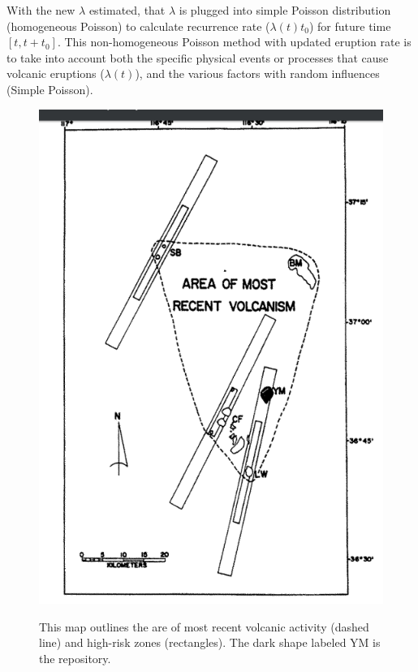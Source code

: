 \documentclass[12pt]{article}
\begin{document}
With the new $\lambda$ estimated, that $\lambda$ is plugged into simple Poisson distribution
(homogeneous Poisson) to calculate recurrence rate ($\lambda(t) t_0 $) for future time $[t, t+t_0]$.
This non-homogeneous Poisson method with updated eruption rate is to take into account both the 
specific physical events or processes that cause volcanic eruptions ($\lambda(t)$), and the 
various factors with random influences (Simple Poisson).

\begin{figure}
\centering
\caption{This map outlines the are of most recent volcanic activity (dashed line)
and high-risk zones (rectangles). The dark shape labeled YM is the repository.}

\includegraphics[scale=0.3]{./images/map.png}
\vspace{-10pt}
\label{fig:map}

\end{figure}
\end{document}

